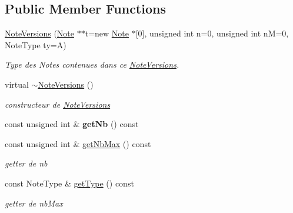 \subsection*{Public Member Functions}
\begin{DoxyCompactItemize}
\item 
\mbox{\label{classNoteVersions_a5b5ce778ba505aa3d54d3ab35699e91e}} 
\hyperlink{classNoteVersions_a5b5ce778ba505aa3d54d3ab35699e91e}{Note\+Versions} (\hyperlink{classNote}{Note} $\ast$$\ast$t=new \hyperlink{classNote}{Note} $\ast$\mbox{[}0\mbox{]}, unsigned int n=0, unsigned int nM=0, Note\+Type ty=A)
\begin{DoxyCompactList}\small\item\em Type des Notes contenues dans ce \hyperlink{classNoteVersions}{Note\+Versions}. \end{DoxyCompactList}\item 
virtual \hyperlink{classNoteVersions_a4e44ca55ef4a836e1da94933b87b1148}{$\sim$\+Note\+Versions} ()
\begin{DoxyCompactList}\small\item\em constructeur de \hyperlink{classNoteVersions}{Note\+Versions} \end{DoxyCompactList}\item 
\mbox{\label{classNoteVersions_a1433cc485e271d4969207f2dd072b2d6}} 
const unsigned int \& {\bfseries get\+Nb} () const
\item 
\mbox{\label{classNoteVersions_a58728fddeb28c0f8485c8eb6db2e5742}} 
const unsigned int \& \hyperlink{classNoteVersions_a58728fddeb28c0f8485c8eb6db2e5742}{get\+Nb\+Max} () const
\begin{DoxyCompactList}\small\item\em getter de nb \end{DoxyCompactList}\item 
\mbox{\label{classNoteVersions_a894cdd113569ffbeaae3e66ff321f63f}} 
const Note\+Type \& \hyperlink{classNoteVersions_a894cdd113569ffbeaae3e66ff321f63f}{get\+Type} () const
\begin{DoxyCompactList}\small\item\em getter de nb\+Max \end{DoxyCompactList}\item 
\mbox{\label{classNoteVersions_a6d73ab55ce082005d7792b434687af0e}} 
$$
\end{DoxyCompactItemize}
